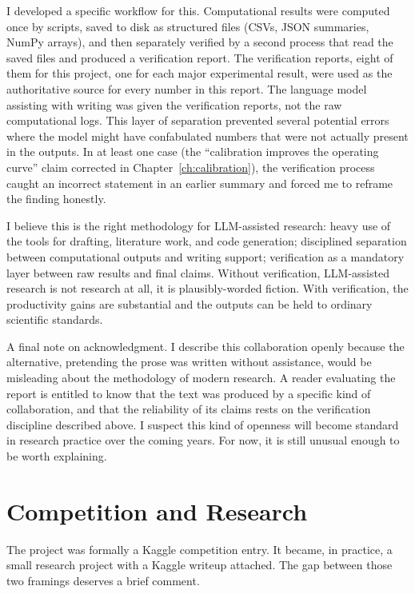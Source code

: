 I developed a specific workflow for this. Computational results were computed once by scripts, saved to disk as structured files (CSVs, JSON summaries, NumPy arrays), and then separately verified by a second process that read the saved files and produced a verification report. The verification reports, eight of them for this project, one for each major experimental result, were used as the authoritative source for every number in this report. The language model assisting with writing was given the verification reports, not the raw computational logs. This layer of separation prevented several potential errors where the model might have confabulated numbers that were not actually present in the outputs. In at least one case (the ``calibration improves the operating curve'' claim corrected in Chapter~\ref{ch:calibration}), the verification process caught an incorrect statement in an earlier summary and forced me to reframe the finding honestly.

I believe this is the right methodology for LLM-assisted research: heavy use of the tools for drafting, literature work, and code generation; disciplined separation between computational outputs and writing support; verification as a mandatory layer between raw results and final claims. Without verification, LLM-assisted research is not research at all, it is plausibly-worded fiction. With verification, the productivity gains are substantial and the outputs can be held to ordinary scientific standards.

A final note on acknowledgment. I describe this collaboration openly because the alternative, pretending the prose was written without assistance, would be misleading about the methodology of modern research. A reader evaluating the report is entitled to know that the text was produced by a specific kind of collaboration, and that the reliability of its claims rests on the verification discipline described above. I suspect this kind of openness will become standard in research practice over the coming years. For now, it is still unusual enough to be worth explaining.

\section{Competition and Research}

The project was formally a Kaggle competition entry. It became, in practice, a small research project with a Kaggle writeup attached. The gap between those two framings deserves a brief comment.

